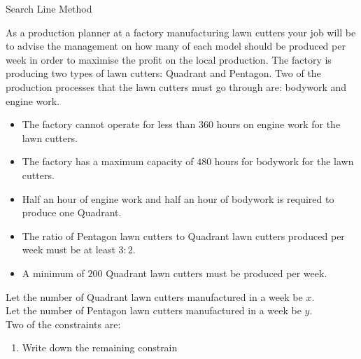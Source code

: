 \begin{wex}
{Search Line Method}{As a production planner at a factory manufacturing lawn cutters your job
will be to advise the management on how many of each model should be produced per week in
order to maximise the profit on the local production. The factory is producing two types of
lawn cutters: Quadrant and Pentagon.
Two of the production processes that the lawn cutters must go through are: bodywork and engine work.
\begin{itemize}
\item{The factory cannot operate for less than $360$ hours on engine work for the lawn cutters.}
\item{The factory has a maximum capacity of $480$ hours for bodywork for the lawn cutters.}
\item{Half an hour of engine work and half an hour of bodywork is required to produce one
Quadrant.}
\item{The ratio of Pentagon lawn cutters to Quadrant lawn cutters produced per week must be at
least $3:2$.}
\item{A minimum of $200$ Quadrant lawn cutters must be produced per week.}
\end{itemize}
Let the number of Quadrant lawn cutters manufactured in a week be $x$.\\
Let the number of Pentagon lawn cutters manufactured in a week be $y$.\\
Two of the constraints are:
\begin{enumerate}
\item{Write down the remaining constrain
}
\end{enumerate}}
\end{wex}
